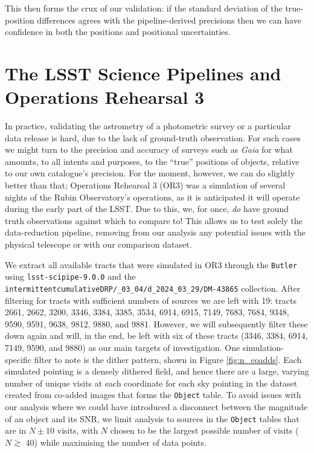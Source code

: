 \documentclass[SE,authoryear,toc]{lsstdoc}
\begin{document}
This then forms the crux of our validation: if the standard deviation of the true-position differences agrees with the pipeline-derived precisions then we can have confidence in both the positions and positional uncertainties.

\section{The LSST Science Pipelines and Operations Rehearsal 3}
\label{sec:pipeline_or3}
In practice, validating the astrometry of a photometric survey or a particular data release is hard, due to the lack of ground-truth observation.
For such cases we might turn to the precision and accuracy of surveys such as \textit{Gaia} \citep{Collaboration2021} for what amounts, to all intents and purposes, to the ``true'' positions of objects, relative to our own catalogue's precision.
For the moment, however, we can do slightly better than that; Operations Rehearsal 3 (OR3) was a simulation of several nights of the Rubin Observatory's operations, as it is anticipated it will operate during the early part of the LSST.
Due to this, we, for once, \textit{do} have ground truth observations against which to compare to!
This allows us to test solely the data-reduction pipeline, removing from our analysis any potential issues with the physical telescope or with our comparison dataset.

We extract all available tracts that were simulated in OR3 through the \texttt{Butler} using \texttt{lsst-scipipe-9.0.0} and the \texttt{intermittentcumulativeDRP/\_03\_04/\allowbreak d\_2024\_03\_29/DM-43865} collection.
After filtering for tracts with sufficient numbers of sources we are left with 19: tracts 2661, 2662, 3200, 3346, 3384, 3385, 3534, 6914, 6915, 7149, 7683, 7684, 9348, 9590, 9591, 9638, 9812, 9880, and 9881.
However, we will subsequently filter these down again and will, in the end, be left with six of these tracts (3346, 3384, 6914, 7149, 9590, and 9880) as our main targets of investigation.
One simulation-specific filter to note is the dither pattern, shown in Figure \ref{fig:n_coadds}.
Each simulated pointing is a densely dithered field, and hence there are a large, varying number of unique visits at each coordinate for each sky pointing in the dataset created from co-added images that forms the \texttt{Object} table.
To avoid issues with our analysis where we could have introduced a disconnect between the magnitude of an object and its SNR, we limit analysis to sources in the \texttt{Object} tables that are in $N\pm10$ visits, with $N$ chosen to be the largest possible number of visits ($N \gtrsim$ 40) while maximising the number of data points.
\end{document}

